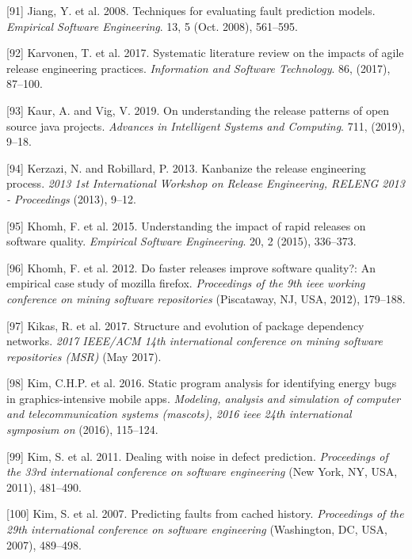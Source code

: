 \documentclass[]{book}
\begin{document}
\hypertarget{ref-Jiang2008}{}
{[}91{]} Jiang, Y. et al. 2008. Techniques for evaluating fault
prediction models. \emph{Empirical Software Engineering}. 13, 5 (Oct.
2008), 561--595.

\hypertarget{ref-karvonen2017a}{}
{[}92{]} Karvonen, T. et al. 2017. Systematic literature review on the
impacts of agile release engineering practices. \emph{Information and
Software Technology}. 86, (2017), 87--100.

\hypertarget{ref-kaur2019a}{}
{[}93{]} Kaur, A. and Vig, V. 2019. On understanding the release
patterns of open source java projects. \emph{Advances in Intelligent
Systems and Computing}. 711, (2019), 9--18.

\hypertarget{ref-kerzazi2013a}{}
{[}94{]} Kerzazi, N. and Robillard, P. 2013. Kanbanize the release
engineering process. \emph{2013 1st International Workshop on Release
Engineering, RELENG 2013 - Proceedings} (2013), 9--12.

\hypertarget{ref-khomh2015a}{}
{[}95{]} Khomh, F. et al. 2015. Understanding the impact of rapid
releases on software quality. \emph{Empirical Software Engineering}. 20,
2 (2015), 336--373.

\hypertarget{ref-khomh2012a}{}
{[}96{]} Khomh, F. et al. 2012. Do faster releases improve software
quality?: An empirical case study of mozilla firefox. \emph{Proceedings
of the 9th ieee working conference on mining software repositories}
(Piscataway, NJ, USA, 2012), 179--188.

\hypertarget{ref-Kikas2017}{}
{[}97{]} Kikas, R. et al. 2017. Structure and evolution of package
dependency networks. \emph{2017 IEEE/ACM 14th international conference
on mining software repositories (MSR)} (May 2017).

\hypertarget{ref-KKK2016}{}
{[}98{]} Kim, C.H.P. et al. 2016. Static program analysis for
identifying energy bugs in graphics-intensive mobile apps.
\emph{Modeling, analysis and simulation of computer and
telecommunication systems (mascots), 2016 ieee 24th international
symposium on} (2016), 115--124.

\hypertarget{ref-Kim2011}{}
{[}99{]} Kim, S. et al. 2011. Dealing with noise in defect prediction.
\emph{Proceedings of the 33rd international conference on software
engineering} (New York, NY, USA, 2011), 481--490.

\hypertarget{ref-kim2007}{}
{[}100{]} Kim, S. et al. 2007. Predicting faults from cached history.
\emph{Proceedings of the 29th international conference on software
engineering} (Washington, DC, USA, 2007), 489--498.
\end{document}

